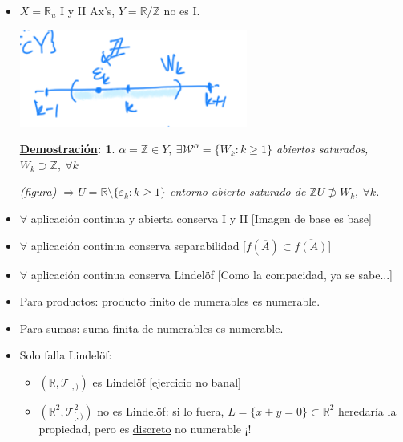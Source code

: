 \documentclass[10pt,a4paper,openright]{book}
\theoremstyle{break}
\newtheorem*{demo}{\underline{Demostración}:}
\begin{document}
\begin{itemize}
    \item $X = \mathbb{R}_u$ I y II Ax's, $Y = \mathbb{R}/\mathbb{Z}$ no es I.
    \begin{center}
        \includegraphics[scale=0.3]{images/ej_axiomas_num_real} 
    \end{center}
    \begin{demo}
        $\alpha = \mathbb{Z} \in Y,\ \exists \mathcal{W}^{\alpha} = \{W_k : k \ge 1\}$ abiertos saturados, $W_k \supset \mathbb{Z},\ \forall k$

        (figura) $\Rightarrow U = \mathbb{R} \setminus \{\varepsilon_k : k \ge 1\}$ entorno abierto saturado de $\mathbb{Z} U \not \supset W_k,\ \forall k$.
    \end{demo}

    \item $\forall$ aplicación continua y abierta conserva I y II [Imagen de base es base]
    \item $\forall $ aplicación continua conserva separabilidad [$f\left( \overline{A} \right) \subset \overline{f\left( A \right)}$]
    \item $\forall$ aplicación continua conserva Lindelöf [Como la compacidad, ya se sabe...]
\end{itemize}

\begin{itemize}
    \item Para productos: producto finito de numerables es numerable.
    \item Para sumas: suma finita de numerables es numerable.
    \item Solo falla Lindelöf:
    \begin{itemize}
        \item $\left( \mathbb{R}, \mathcal{T}_{[, )} \right)$ es Lindelöf [ejercicio no banal]
        \item $\left( \mathbb{R}^2, \mathcal{T}_{[, )}^2 \right)$ no es Lindelöf: si lo fuera, $L = \{x + y = 0\} \subset \mathbb{R}^2$ heredaría la propiedad, pero es \underline{discreto} no numerable ¡!
    \end{itemize}
\end{itemize}
\end{document}
